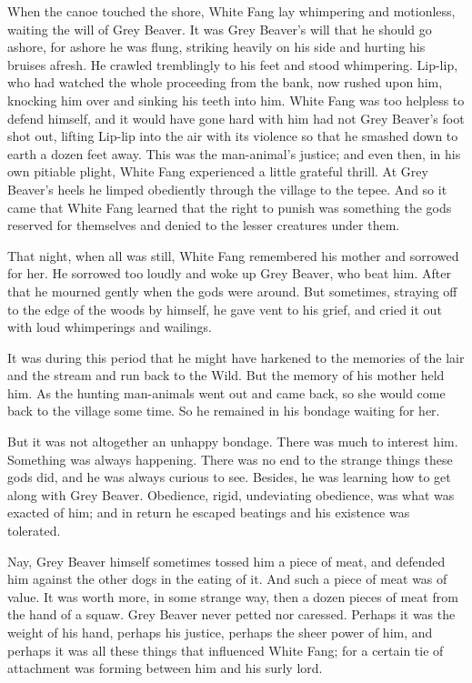 \documentclass[10pt]{book}
\begin{document}
When the canoe touched the shore, White Fang lay whimpering and
motionless, waiting the will of Grey Beaver. It was Grey Beaver’s will
that he should go ashore, for ashore he was flung, striking heavily on
his side and hurting his bruises afresh. He crawled tremblingly to his
feet and stood whimpering. Lip-lip, who had watched the whole
proceeding from the bank, now rushed upon him, knocking him over and
sinking his teeth into him. White Fang was too helpless to defend
himself, and it would have gone hard with him had not Grey Beaver’s
foot shot out, lifting Lip-lip into the air with its violence so that
he smashed down to earth a dozen feet away. This was the man-animal’s
justice; and even then, in his own pitiable plight, White Fang
experienced a little grateful thrill. At Grey Beaver’s heels he limped
obediently through the village to the tepee. And so it came that White
Fang learned that the right to punish was something the gods reserved
for themselves and denied to the lesser creatures under them.

That night, when all was still, White Fang remembered his mother and
sorrowed for her. He sorrowed too loudly and woke up Grey Beaver, who
beat him. After that he mourned gently when the gods were around. But
sometimes, straying off to the edge of the woods by himself, he gave
vent to his grief, and cried it out with loud whimperings and wailings.

It was during this period that he might have harkened to the memories
of the lair and the stream and run back to the Wild. But the memory of
his mother held him. As the hunting man-animals went out and came back,
so she would come back to the village some time. So he remained in his
bondage waiting for her.

But it was not altogether an unhappy bondage. There was much to
interest him. Something was always happening. There was no end to the
strange things these gods did, and he was always curious to see.
Besides, he was learning how to get along with Grey Beaver. Obedience,
rigid, undeviating obedience, was what was exacted of him; and in
return he escaped beatings and his existence was tolerated.

Nay, Grey Beaver himself sometimes tossed him a piece of meat, and
defended him against the other dogs in the eating of it. And such a
piece of meat was of value. It was worth more, in some strange way,
then a dozen pieces of meat from the hand of a squaw. Grey Beaver never
petted nor caressed. Perhaps it was the weight of his hand, perhaps his
justice, perhaps the sheer power of him, and perhaps it was all these
things that influenced White Fang; for a certain tie of attachment was
forming between him and his surly lord.
\end{document}
